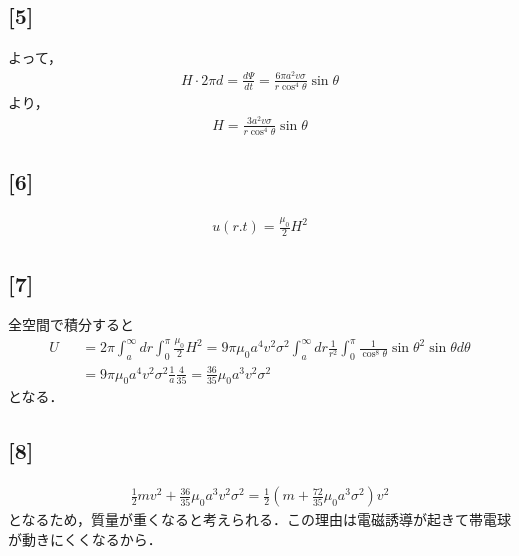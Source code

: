 \documentclass[12pt,dvipdfmx]{jsarticle}
\begin{document}
\subsection*{\large{[5]}}
よって，
\begin{eqnarray}
  H \cdot 2\pi d = \frac{d\Psi}{d t} = \frac{6\pi a^2 v\sigma}{r\cos^4\theta}\sin\theta
\end{eqnarray}
より，
\begin{eqnarray}
  H = \frac{3 a^2 v\sigma}{r\cos^4\theta}\sin\theta
\end{eqnarray}
\subsection*{\large{[6]}}
\begin{eqnarray}
  u(r.t) = \frac{\mu_0}{2}H^2
\end{eqnarray}
\subsection*{\large{[7]}}
全空間で積分すると
\begin{eqnarray}
  U &&= 2\pi \int_a^{\infty}dr \int_0^{\pi} \frac{\mu_0}{2}H^2 = 9\pi \mu_0 a^4v^2\sigma^2 \int_a^{\infty}dr\frac{1}{r^2} \int_0^{\pi} \frac{1}{\cos^8\theta}\sin\theta^2 \sin\theta d\theta\\
  &&=9\pi \mu_0 a^4v^2\sigma^2 \frac{1}{a}\frac{4}{35} = \frac{36}{35} \mu_0 a^3 v^2\sigma^2
\end{eqnarray}
となる．
\subsection*{\large{[8]}}
\begin{eqnarray}
  \frac{1}{2}mv^2 + \frac{36}{35} \mu_0 a^3 v^2\sigma^2 = \frac{1}{2}\left( m+\frac{72}{35} \mu_0 a^3 \sigma^2 \right)v^2
\end{eqnarray}
となるため，質量が重くなると考えられる．この理由は電磁誘導が起きて帯電球が動きにくくなるから．
\end{document}
